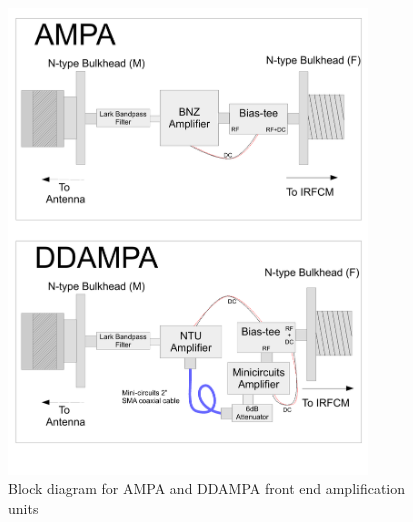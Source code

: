 \begin{figure}
\centering
	\includegraphics[width=0.85\textwidth]{figures/AmpaDDampaBlock}
	\caption{Block diagram for AMPA and DDAMPA front end amplification units}
	\label{fig:AmpaDDampaBlock}
\end{figure}

